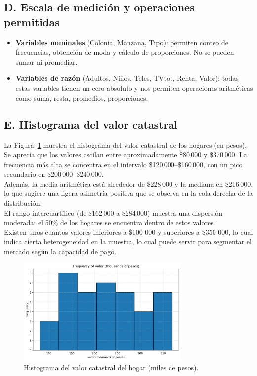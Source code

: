 \documentclass[10pt]{article}
\begin{document}
\subsection*{D. Escala de medición y operaciones permitidas}
\begin{itemize}
    \item \textbf{Variables nominales} (Colonia, Manzana, Tipo): permiten conteo de frecuencias, obtención de moda y cálculo de proporciones. No se pueden sumar ni promediar.
    \item \textbf{Variables de razón} (Adultos, Niños, Teles, TVtot, Renta, Valor): todas estas variables tienen un cero absoluto y nos permiten operaciones aritméticas como suma, resta, promedios, proporciones.
\end{itemize}

\subsection*{E. Histograma del valor catastral}
La Figura~\ref{fig:hist_valor} muestra el histograma del valor catastral de los hogares (en pesos). 
Se aprecia que los valores oscilan entre aproximadamente \$80\,000 y \$370\,000. 
La frecuencia más alta se concentra en el intervalo \$120\,000–\$160\,000, con un pico secundario en \$200\,000–\$240\,000.\\
Además, la media aritmética está alrededor de \$228\,000 y la mediana en \$216\,000, lo que sugiere una ligera asimetría positiva que se observa en la cola derecha de la distribución.\\
El rango intercuartílico (de \$162\,000 a \$284\,000) muestra una dispersión moderada: el 50\% de los hogares se encuentra dentro de estos valores.\\
Existen unos cuantos valores inferiores a \$100 000 y superiores a \$350 000, lo cual indica cierta heterogeneidad en la muestra, lo cual puede servir para segmentar el mercado según la capacidad de pago.

\begin{figure}[H]   
    \centering
    \includegraphics[width=0.75\textwidth]{../plots/python/freq_valor.png}
    \caption{Histograma del valor catastral del hogar (miles de pesos).}
    \label{fig:hist_valor}
\end{figure}
\end{document}
